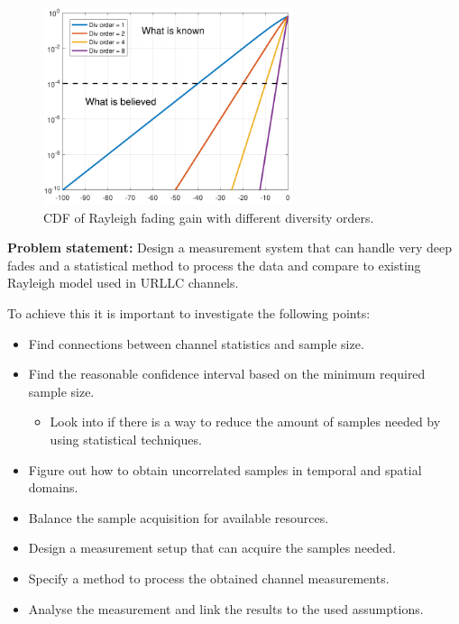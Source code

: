 \begin{figure}[H]
\centering
\includegraphics[width=0.65\textwidth]{figures/fading_gain.pdf}
\caption{\Gls{CDF} of Rayleigh fading gain with different diversity orders.}
\label{fading_gain}
\end{figure}


\textbf{Problem statement:}
Design a measurement system that can handle very deep fades and a statistical method to process the data and compare to existing Rayleigh model used in URLLC channels.




To achieve this it is important to investigate the following points: 
\begin{itemize}
	\item Find connections between channel statistics and sample size.
	\item Find the reasonable confidence interval based on the minimum required sample size.
	\begin{itemize}
	\item Look into if there is a way to reduce the amount of samples needed by using statistical techniques.
 	\end{itemize}
	\item Figure out how to obtain uncorrelated samples in temporal and spatial domains.
	\item Balance the sample acquisition for available resources. 
	\item Design  a measurement setup that can acquire the samples needed.
	\item Specify a method to process the obtained channel measurements.
	\item Analyse the measurement and link the results to the used assumptions.
\end{itemize}




